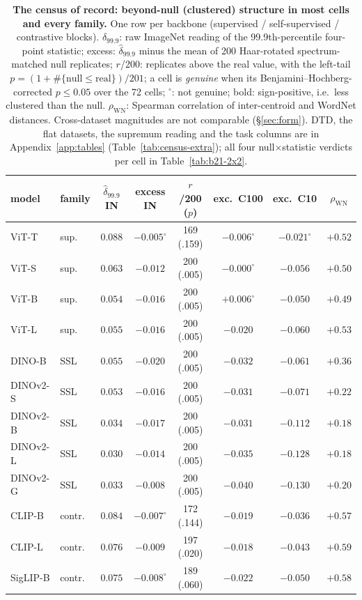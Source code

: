 \begin{table}[t]
\centering
\small
\setlength{\tabcolsep}{3.4pt}
\begin{tabular}{l l c c c c c c}
\toprule
model & family & $\hat\delta_{99.9}$ IN & excess IN & $r$/200 ($p$) & exc.\ C100 & exc.\ C10 & $\rho_{\text{WN}}$ \\
\midrule
ViT-T & sup. & $0.088$ & $-0.005^{\circ}$ & 169 (.159) & $-0.006^{\circ}$ & $-0.021^{\circ}$ & $+0.52$ \\
ViT-S & sup. & $0.063$ & $-0.012$ & 200 (.005) & $-0.000^{\circ}$ & $-0.056$ & $+0.50$ \\
ViT-B & sup. & $0.054$ & $-0.016$ & 200 (.005) & \textbf{$+0.006^{\circ}$} & $-0.050$ & $+0.49$ \\
ViT-L & sup. & $0.055$ & $-0.016$ & 200 (.005) & $-0.020$ & $-0.060$ & $+0.53$ \\
\midrule
DINO-B & SSL & $0.055$ & $-0.020$ & 200 (.005) & $-0.032$ & $-0.061$ & $+0.36$ \\
DINOv2-S & SSL & $0.053$ & $-0.016$ & 200 (.005) & $-0.031$ & $-0.071$ & $+0.22$ \\
DINOv2-B & SSL & $0.034$ & $-0.017$ & 200 (.005) & $-0.031$ & $-0.112$ & $+0.18$ \\
DINOv2-L & SSL & $0.030$ & $-0.014$ & 200 (.005) & $-0.035$ & $-0.128$ & $+0.18$ \\
DINOv2-G & SSL & $0.033$ & $-0.008$ & 200 (.005) & $-0.040$ & $-0.130$ & $+0.20$ \\
\midrule
CLIP-B & contr. & $0.084$ & $-0.007^{\circ}$ & 172 (.144) & $-0.019$ & $-0.036$ & $+0.57$ \\
CLIP-L & contr. & $0.076$ & $-0.009$ & 197 (.020) & $-0.018$ & $-0.043$ & $+0.59$ \\
SigLIP-B & contr. & $0.075$ & $-0.008^{\circ}$ & 189 (.060) & $-0.022$ & $-0.050$ & $+0.58$ \\
\bottomrule
\end{tabular}
\caption{\textbf{The census of record: beyond-null (clustered) structure in most cells and every family.} One row per backbone (supervised / self-supervised / contrastive blocks). $\hat\delta_{99.9}$: raw ImageNet reading of the 99.9th-percentile four-point statistic; excess: $\hat\delta_{99.9}$ minus the mean of 200 Haar-rotated spectrum-matched null replicates; $r$/200: replicates above the real value, with the left-tail $p=(1+\#\{\text{null}\le\text{real}\})/201$; a cell is \emph{genuine} when its Benjamini--Hochberg-corrected $p\le0.05$ over the 72 cells; $^{\circ}$: not genuine; bold: sign-positive, i.e.\ less clustered than the null. $\rho_{\text{WN}}$: Spearman correlation of inter-centroid and WordNet distances. Cross-dataset magnitudes are not comparable (\S\ref{sec:form}). DTD, the flat datasets, the supremum reading and the task columns are in Appendix~\ref{app:tables} (Table~\ref{tab:census-extra}); all four null$\times$statistic verdicts per cell in Table~\ref{tab:b21-2x2}. %
}
\label{tab:census}
\end{table}

